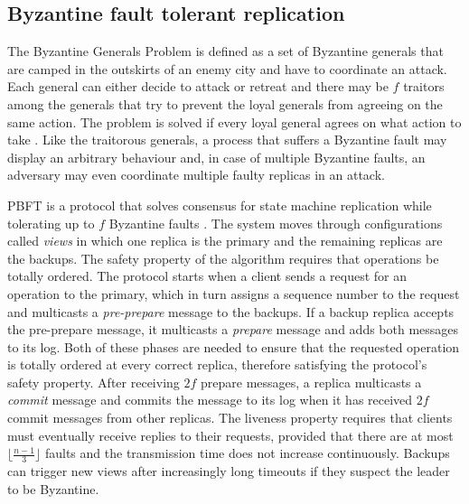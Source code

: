 \subsection{Byzantine fault tolerant replication} \label{Non-Crash}
The Byzantine Generals Problem is defined as a set of Byzantine generals that are camped in the outskirts of an enemy city and have to coordinate an attack. Each general can either decide to attack or retreat and there may be $f$ traitors among the generals that try to prevent the loyal generals from agreeing on the same action. The problem is solved if every loyal general agrees on what action to take \cite{LSP82}. Like the traitorous generals, a process that suffers a Byzantine fault may display an arbitrary behaviour and, in case of multiple Byzantine faults, an adversary may even coordinate multiple faulty replicas in an attack. \par
PBFT is a protocol that solves consensus for state machine replication while tolerating up to $f$ Byzantine faults \cite{CL99}. The system moves through configurations called \textit{views} in which one replica is the primary and the remaining replicas are the backups. The safety property of the algorithm requires that operations be totally ordered. The protocol starts when a client sends a request for an operation to the primary, which in turn assigns a sequence number to the request and multicasts a \textit{pre-prepare} message to the backups. If a backup replica accepts the pre-prepare message, it multicasts a \textit{prepare} message and adds both messages to its log. Both of these phases are needed to ensure that the requested operation is totally ordered at every correct replica, therefore satisfying the protocol's safety property. After receiving $2f$ prepare messages, a replica multicasts a \textit{commit} message and commits the message to its log when it has received $2f$ commit messages from other replicas. The liveness property requires that clients must eventually receive replies to their requests, provided that there are at most $\lfloor\frac{n-1}{3}\rfloor$ faults and the transmission time does not increase continuously. Backups can trigger new views after increasingly long timeouts if they suspect the leader to be Byzantine. \par
